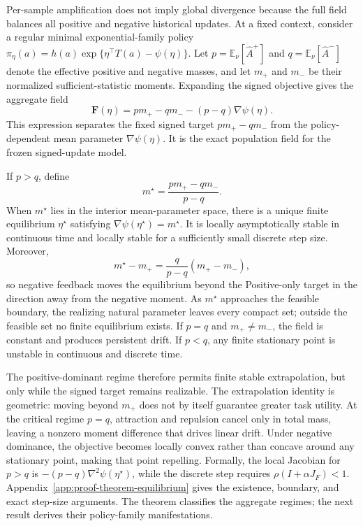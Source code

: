 Per-sample amplification does not imply global divergence because the full field balances all positive and negative historical updates. At a fixed context, consider a regular minimal exponential-family policy $\pi_\eta(a)=h(a)\exp\{\eta^\top T(a)-\psi(\eta)\}$. Let $p=\mathbb E_\nu[\widehat A^+]$ and $q=\mathbb E_\nu[\widehat A^-]$ denote the effective positive and negative masses, and let $m_+$ and $m_-$ be their normalized sufficient-statistic moments. Expanding the signed objective gives the aggregate field
\begin{equation}
\mathbf F(\eta)=pm_+-qm_--(p-q)\nabla\psi(\eta).
\label{eq:aggregate-field}
\end{equation}
This expression separates the fixed signed target $pm_+-qm_-$ from the policy-dependent mean parameter $\nabla\psi(\eta)$. It is the exact population field for the frozen signed-update model.
\begin{theorem}
\label{thm:equilibrium}
If $p>q$, define
\begin{equation}
m^\star=\frac{pm_+-qm_-}{p-q}.
\label{eq:signed-target}
\end{equation}
When $m^\star$ lies in the interior mean-parameter space, there is a unique finite equilibrium $\eta^\star$ satisfying $\nabla\psi(\eta^\star)=m^\star$. It is locally asymptotically stable in continuous time and locally stable for a sufficiently small discrete step size. Moreover,
\begin{equation}
m^\star-m_+=\frac{q}{p-q}(m_+-m_-),
\end{equation}
so negative feedback moves the equilibrium beyond the Positive-only target in the direction away from the negative moment. As $m^\star$ approaches the feasible boundary, the realizing natural parameter leaves every compact set; outside the feasible set no finite equilibrium exists. If $p=q$ and $m_+\ne m_-$, the field is constant and produces persistent drift. If $p<q$, any finite stationary point is unstable in continuous and discrete time.
\end{theorem}
The positive-dominant regime therefore permits finite stable extrapolation, but only while the signed target remains realizable. The extrapolation identity is geometric: moving beyond $m_+$ does not by itself guarantee greater task utility. At the critical regime $p=q$, attraction and repulsion cancel only in total mass, leaving a nonzero moment difference that drives linear drift. Under negative dominance, the objective becomes locally convex rather than concave around any stationary point, making that point repelling. Formally, the local Jacobian for $p>q$ is $-(p-q)\nabla^2\psi(\eta^\star)$, while the discrete step requires $\rho(I+\alpha J_F)<1$. Appendix~\ref{app:proof-theorem-equilibrium} gives the existence, boundary, and exact step-size arguments. The theorem classifies the aggregate regimes; the next result derives their policy-family manifestations.

